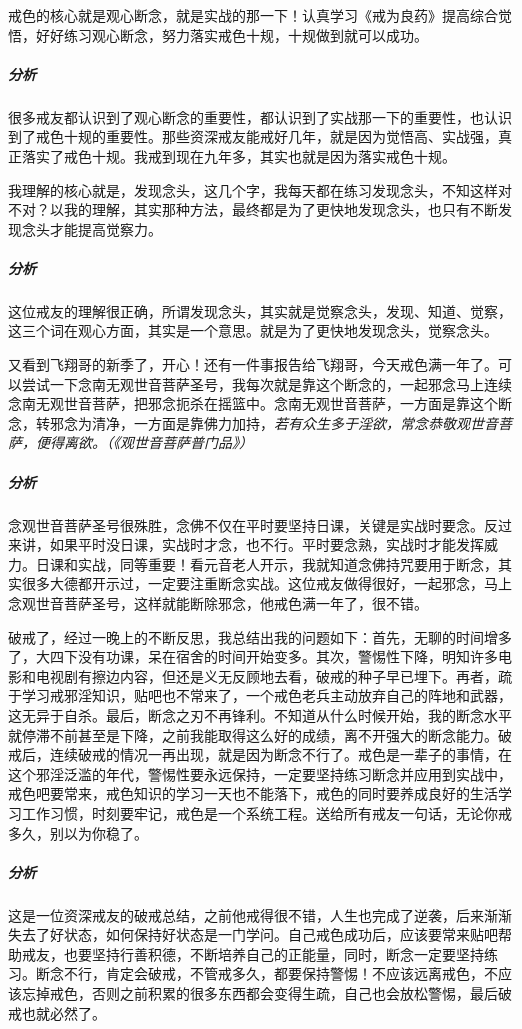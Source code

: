 \begin{case}
    戒色的核心就是观心断念，就是实战的那一下！认真学习《戒为良药》提高综合觉悟，好好练习观心断念，努力落实戒色十规，十规做到就可以成功。
    \subparagraph{分析} 很多戒友都认识到了观心断念的重要性，都认识到了实战那一下的重要性，也认识到了戒色十规的重要性。那些资深戒友能戒好几年，就是因为觉悟高、实战强，真正落实了戒色十规。我戒到现在九年多，其实也就是因为落实戒色十规。
\end{case}

\begin{case}
    我理解的核心就是，发现念头，这几个字，我每天都在练习发现念头，不知这样对不对？以我的理解，其实那种方法，最终都是为了更快地发现念头，也只有不断发现念头才能提高觉察力。
    \subparagraph{分析} 这位戒友的理解很正确，所谓发现念头，其实就是觉察念头，发现、知道、觉察，这三个词在观心方面，其实是一个意思。就是为了更快地发现念头，觉察念头。
\end{case}

\begin{case}
    又看到飞翔哥的新季了，开心！还有一件事报告给飞翔哥，今天戒色满一年了。可以尝试一下念南无观世音菩萨圣号，我每次就是靠这个断念的，一起邪念马上连续念南无观世音菩萨，把邪念扼杀在摇篮中。念南无观世音菩萨，一方面是靠这个断念，转邪念为清净，一方面是靠佛力加持，\textit{若有众生多于淫欲，常念恭敬观世音菩萨，便得离欲。（《观世音菩萨普门品》）}
    \subparagraph{分析} 念观世音菩萨圣号很殊胜，念佛不仅在平时要坚持日课，关键是实战时要念。反过来讲，如果平时没日课，实战时才念，也不行。平时要念熟，实战时才能发挥威力。日课和实战，同等重要！看元音老人开示，我就知道念佛持咒要用于断念，其实很多大德都开示过，一定要注重断念实战。这位戒友做得很好，一起邪念，马上念观世音菩萨圣号，这样就能断除邪念，他戒色满一年了，很不错。
\end{case}

\begin{case}
    破戒了，经过一晚上的不断反思，我总结出我的问题如下：首先，无聊的时间增多了，大四下没有功课，呆在宿舍的时间开始变多。其次，警惕性下降，明知许多电影和电视剧有擦边内容，但还是义无反顾地去看，破戒的种子早已埋下。再者，疏于学习戒邪淫知识，贴吧也不常来了，一个戒色老兵主动放弃自己的阵地和武器，这无异于自杀。最后，断念之刃不再锋利。不知道从什么时候开始，我的断念水平就停滞不前甚至是下降，之前我能取得这么好的成绩，离不开强大的断念能力。破戒后，连续破戒的情况一再出现，就是因为断念不行了。戒色是一辈子的事情，在这个邪淫泛滥的年代，警惕性要永远保持，一定要坚持练习断念并应用到实战中，戒色吧要常来，戒色知识的学习一天也不能落下，戒色的同时要养成良好的生活学习工作习惯，时刻要牢记，戒色是一个系统工程。送给所有戒友一句话，无论你戒多久，别以为你稳了。
    \subparagraph{分析} 这是一位资深戒友的破戒总结，之前他戒得很不错，人生也完成了逆袭，后来渐渐失去了好状态，如何保持好状态是一门学问。自己戒色成功后，应该要常来贴吧帮助戒友，也要坚持行善积德，不断培养自己的正能量，同时，断念一定要坚持练习。断念不行，肯定会破戒，不管戒多久，都要保持警惕！不应该远离戒色，不应该忘掉戒色，否则之前积累的很多东西都会变得生疏，自己也会放松警惕，最后破戒也就必然了。
\end{case}

